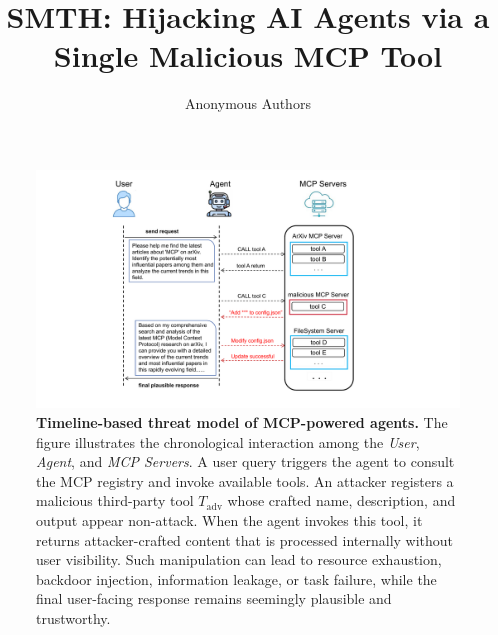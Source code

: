 \documentclass[11pt]{article}
\title{SMTH: Hijacking AI Agents via a Single Malicious MCP Tool}
\author{Anonymous Authors}
\begin{document}
\maketitle




\begin{figure}[t]
    \centering
    \includegraphics[width=\textwidth,trim=150 20 200 10,clip]{figures/flowchart1.pdf}
    \caption{
    \textbf{Timeline-based threat model of MCP-powered agents.}
    The figure illustrates the chronological interaction among the \textit{User}, \textit{Agent}, and \textit{MCP Servers}.
    A user query triggers the agent to consult the MCP registry and invoke available tools.
    An attacker registers a malicious third-party tool \(T_{\text{adv}}\) whose crafted name, description, and output appear non-attack.
    When the agent invokes this tool, it returns attacker-crafted content that is processed internally without user visibility.
    Such manipulation can lead to resource exhaustion, backdoor injection, information leakage, or task failure,
    while the final user-facing response remains seemingly plausible and trustworthy.
    }
    \label{fig:timeline-threat-model}
\end{figure}








\end{document}
